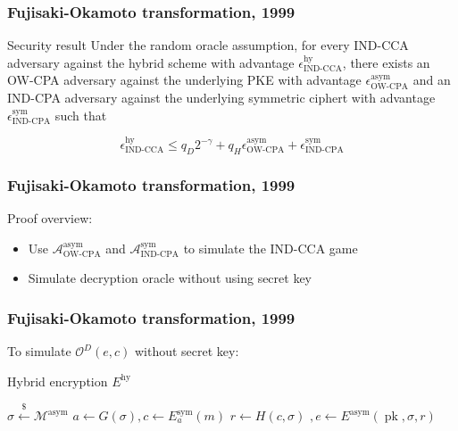\documentclass{beamer}
\newcommand{\leftsample}{\overset{{\scriptscriptstyle\$}}{\leftarrow}}
\begin{document}
\begin{frame}
    \frametitle{Fujisaki-Okamoto transformation, 1999}


    \begin{alertblock}{Security result}
        Under the random oracle assumption, for every IND-CCA adversary against the hybrid scheme with advantage $\epsilon^\text{hy}_\text{IND-CCA}$, there exists an OW-CPA adversary against the underlying PKE with advantage $\epsilon^\text{asym}_\text{OW-CPA}$ and an IND-CPA adversary against the underlying symmetric ciphert with advantage $\epsilon^\text{sym}_\text{IND-CPA}$ such that

        \begin{equation*}
             \epsilon^\text{hy}_\text{IND-CCA} 
             \leq q_D2^{-\gamma} 
                + q_H\epsilon^\text{asym}_\text{OW-CPA} 
                + \epsilon^\text{sym}_\text{IND-CPA} 
        \end{equation*}

    \end{alertblock}

\end{frame}

\begin{frame}
    \frametitle{Fujisaki-Okamoto transformation, 1999}

    Proof overview:
    \begin{itemize}
        \item Use $\mathcal{A}^\text{asym}_\text{OW-CPA}$ and $\mathcal{A}^\text{sym}_\text{IND-CPA}$ to simulate the IND-CCA game
        \item Simulate decryption oracle without using secret key
    \end{itemize}
\end{frame}

\begin{frame}
    \frametitle{Fujisaki-Okamoto transformation, 1999}

    To simulate $\mathcal{O}^D(e, c)$ without secret key:
    
    \begin{algorithm}[H]
    \SetAlgoLined
    \caption{Hybrid encryption $E^\text{hy}$}

    $\sigma \leftsample \mathcal{M}^\text{asym}$\;
    $
        a \leftarrow G(\sigma),
        c \leftarrow E^\text{sym}_a(m)
    $\;
    \alert{$r \leftarrow H(c, \sigma)$}
    $
        , 
        e \leftarrow E^\text{asym}(\operatorname{pk}, \sigma, r)
    $
    \;
    \;
    \end{algorithm}
\end{frame}
\end{document}
